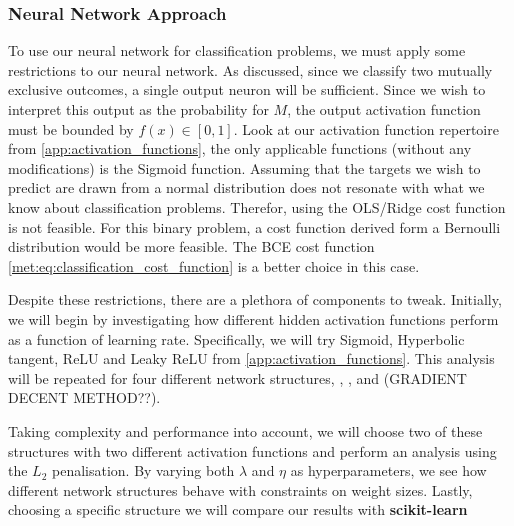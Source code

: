     \subsubsection{Neural Network Approach}
    To use our neural network for classification problems, we must apply some restrictions to our neural network. As discussed, since we classify two mutually exclusive outcomes, a single output neuron will be sufficient. Since we wish to interpret this output as the probability for $M$, the output activation function must be bounded by $f(x) \in [0,1]$. Look at our activation function repertoire from \cref{app:activation_functions}, the only applicable functions (without any modifications) is the Sigmoid function. Assuming that the targets we wish to predict are drawn from a normal distribution does not resonate with what we know about classification problems. Therefor, using the OLS/Ridge cost function is not feasible. For this binary problem, a cost function derived form a Bernoulli distribution would be more feasible. The BCE cost function \cref{met:eq:classification_cost_function} is a better choice in this case.     
    
    Despite these restrictions, there are a plethora of components to tweak. Initially, we will begin by investigating how different hidden activation functions perform as a function of learning rate. Specifically, we will try Sigmoid, Hyperbolic tangent, ReLU and Leaky ReLU from \cref{app:activation_functions}. This analysis will be repeated for four different network structures, , ,  and   (GRADIENT DECENT METHOD??).

    Taking complexity and performance into account, we will choose two of these structures with two different activation functions and perform an analysis using the $L_2$ penalisation. By varying both $\lambda$ and $\eta$ as hyperparameters, we see how different network structures behave with constraints on weight sizes. Lastly, choosing a specific structure we will compare our results with \textbf{scikit-learn} \citep{scikit-learn}
